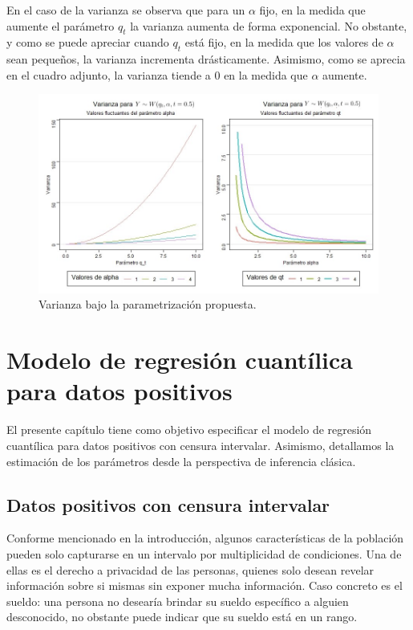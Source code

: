 \documentclass{report}
\begin{document}
En el caso de la varianza se observa que para un $\alpha$ fijo, en la medida que aumente el parámetro $q_{t}$ la varianza aumenta de forma exponencial. No obstante, y como se puede apreciar cuando $q_{t}$ está fijo, en la medida que los valores de $\alpha$ sean pequeños, la varianza incrementa drásticamente. Asimismo, como se aprecia en el cuadro adjunto, la varianza tiende a 0 en la medida que $\alpha$ aumente.

\begin{figure}[H]
	\includegraphics[width=\textwidth]{varianza}
	\caption{Varianza bajo la parametrización propuesta.}
\end{figure}

\chapter{Modelo de regresión cuantílica para datos positivos}
El presente capítulo tiene como objetivo especificar el modelo de regresión cuantílica para datos positivos con censura intervalar. Asimismo, detallamos la estimación de los parámetros desde la perspectiva de inferencia clásica.

\section{Datos positivos con censura intervalar}

Conforme mencionado en la introducción, algunos características de la población pueden solo capturarse en un intervalo por multiplicidad de condiciones. Una de ellas es el derecho a privacidad de las personas, quienes solo desean revelar información sobre si mismas sin exponer mucha información. Caso concreto es el sueldo: una persona no desearía brindar su sueldo específico a alguien desconocido, no obstante puede indicar que su sueldo está en un rango.
\end{document}
